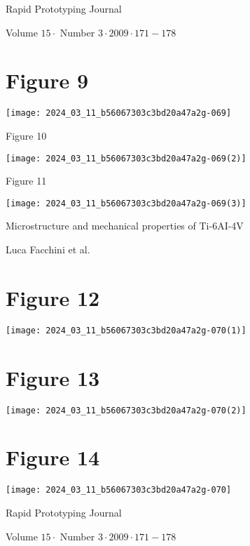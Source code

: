 \documentclass[10pt]{article}
\begin{document}
Rapid Prototyping Journal

Volume $15 \cdot$ Number $3 \cdot 2009 \cdot 171-178$

\section*{Figure 9}
\begin{center}
\texttt{[image: 2024\_03\_11\_b56067303c3bd20a47a2g-069]}
\end{center}

Figure 10

\begin{center}
\texttt{[image: 2024\_03\_11\_b56067303c3bd20a47a2g-069(2)]}
\end{center}

Figure 11

\begin{center}
\texttt{[image: 2024\_03\_11\_b56067303c3bd20a47a2g-069(3)]}
\end{center}

Microstructure and mechanical properties of Ti-6AI-4V

Luca Facchini et al.

\section*{Figure 12}
\begin{center}
\texttt{[image: 2024\_03\_11\_b56067303c3bd20a47a2g-070(1)]}
\end{center}

\section*{Figure 13}
\begin{center}
\texttt{[image: 2024\_03\_11\_b56067303c3bd20a47a2g-070(2)]}
\end{center}

\section*{Figure 14}
\begin{center}
\texttt{[image: 2024\_03\_11\_b56067303c3bd20a47a2g-070]}
\end{center}

Rapid Prototyping Journal

Volume $15 \cdot$ Number $3 \cdot 2009 \cdot 171-178$
\end{document}
